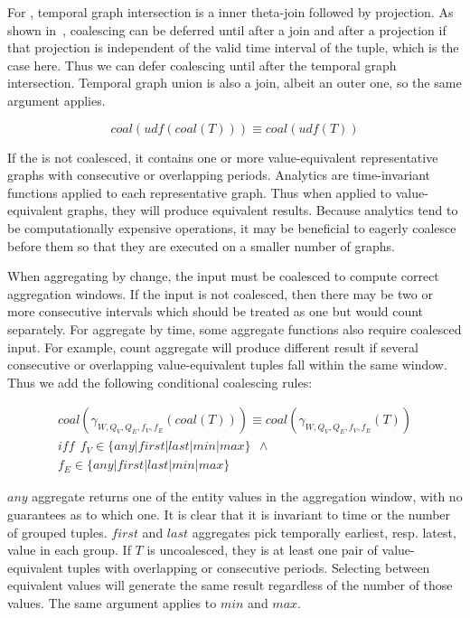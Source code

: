 For \trg, temporal graph intersection is a inner theta-join followed
by projection.  As shown in~\cite{DBLP:conf/vldb/BohlenSS96},
coalescing can be deferred until after a join and after a projection
if that projection is independent of the valid time interval of the
tuple, which is the case here.  Thus we can defer coalescing until
after the temporal graph intersection.  Temporal graph union is also a
join, albeit an outer one, so the same argument applies.

\begin{equation}
coal(udf(coal(T))) \equiv coal(udf(T))
\label{rul:coalr9}
\end{equation}

If the \tg is not coalesced, it contains one or more value-equivalent
representative graphs with consecutive or overlapping periods.
Analytics are time-invariant functions applied to each representative
graph.  Thus when applied to value-equivalent graphs, they will
produce equivalent results.  Because analytics tend to be
computationally expensive operations, it may be beneficial to eagerly
coalesce before them so that they are executed on a smaller number of
graphs.

When aggregating by change, the input must be coalesced to compute
correct aggregation windows.  If the input is not coalesced, then
there may be two or more consecutive intervals which should be treated
as one but would count separately. For aggregate by time, some
aggregate functions also require coalesced input.  For example, count
aggregate will produce different result if several consecutive or
overlapping value-equivalent tuples fall within the same window.  Thus
we add the following conditional coalescing rules:

\begin{multline}
coal(\gamma_{W,Q_V,Q_E,f_V,f_E}(coal(T))) \equiv coal(\gamma_{W,Q_V,Q_E,f_V,f_E}(T)) \\
iff~~f_V \in \{any | first | last | min | max\}~~\wedge \\
f_E \in \{any | first | last | min | max\}
\label{rul:coalr10}
\end{multline}

$any$ aggregate returns one of the entity values in the aggregation
window, with no guarantees as to which one.  It is clear that it is
invariant to time or the number of grouped tuples.  $first$ and $last$
aggregates pick temporally earliest, resp. latest, value in each
group.  If $T$ is uncoalesced, they is at least one pair of
value-equivalent tuples with overlapping or consecutive periods.
Selecting between equivalent values will generate the same result
regardless of the number of those values.  The same argument applies
to $min$ and $max$.

